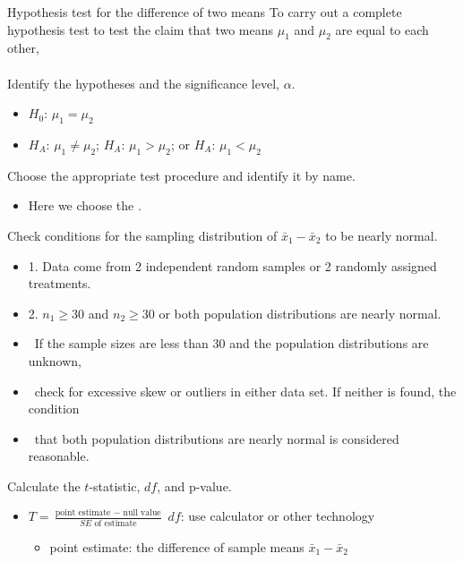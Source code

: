 \begin{onebox}{Hypothesis test for the difference of two means}
To carry out a complete hypothesis test to test the claim that two means $\mu_1$ and $\mu_2$ are equal to each other,
\\
\\
 Identify the hypotheses and the significance level, $\alpha$.
\begin{itemize}\vspace{-1mm}
\setlength{\itemsep}{0mm}
\item[] $H_0$: $\mu_1=\mu_2$  
\item[] $H_A$: $\mu_1\ne \mu_2$; \quad $H_A$: $\mu_1>\mu_2$; \quad or \quad $H_A$: $\mu_1<\mu_2$ 
\end{itemize}
  Choose the appropriate test procedure and identify it by name. \vspace{-1mm}
\begin{itemize}
\item[] Here we choose the .
\end{itemize}
  Check conditions for the sampling distribution of $\bar{x}_1-\bar{x}_2$ to be nearly normal.\vspace{-1mm}
\begin{itemize}
\setlength{\itemsep}{0mm}
\item[] 1. Data come from 2 independent random samples or 2 randomly assigned treatments. 
\item[] 2. $n_1\ge 30$ and $n_2\ge 30$ or both population distributions are nearly normal.
\item[] \quad \ If the sample sizes are less than 30 and the population distributions are unknown, 
\item[] \quad \ check for excessive skew or outliers in either data set.  If neither is found, the condition 
\item[] \quad \ that both population distributions are nearly normal is considered reasonable.  
\end{itemize}
   Calculate the $t$-statistic, $df$, and p-value.
\begin{itemize}
\item[] $T = \frac{\text{point estimate } - \text{ null value}}{SE \text{ of estimate}}$ \quad $df$: use calculator or other technology
\begin{itemize}
\item[] point estimate: the difference of sample means $\bar{x}_1 - \bar{x}_2$

\end{itemize}
\end{itemize}
\end{onebox}
